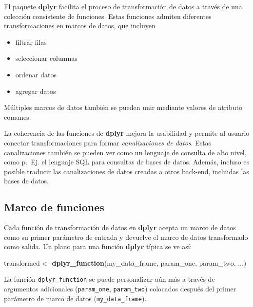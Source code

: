 \documentclass[
]{book}
\newenvironment{Shaded}{\begin{snugshade}}{\end{snugshade}}
\newcommand{\KeywordTok}[1]{\textcolor[rgb]{0.13,0.29,0.53}{\textbf{#1}}}
\newcommand{\NormalTok}[1]{#1}
\newcommand{\StringTok}[1]{\textcolor[rgb]{0.31,0.60,0.02}{#1}}
\providecommand{\tightlist}{%
  \setlength{\itemsep}{0pt}\setlength{\parskip}{0pt}}
\begin{document}
El paquete \textbf{dplyr} facilita el proceso de transformación de datos a través de una colección consistente de funciones. Estas funciones admiten diferentes transformaciones en marcos de datos, que incluyen

\begin{itemize}
\tightlist
\item
  filtrar filas
\item
  seleccionar columnas
\item
  ordenar datos
\item
  agregar datos
\end{itemize}

Múltiples marcos de datos también se pueden unir mediante valores de atributo comunes.

La coherencia de las funciones de \textbf{dplyr} mejora la usabilidad y permite al usuario conectar transformaciones para formar \emph{canalizaciones de datos}. Estas canalizaciones también se pueden ver como un lenguaje de consulta de alto nivel, como p.~Ej. el lenguaje SQL para consultas de bases de datos. Además, incluso es posible traducir las canalizaciones de datos creadas a otros back-end, incluidas las bases de datos.

\hypertarget{marco-de-funciones}{%
\subsection{Marco de funciones}\label{marco-de-funciones}}

Cada función de transformación de datos en \textbf{dplyr} acepta un marco de datos como su primer parámetro de entrada y devuelve el marco de datos transformado como salida. Un plano para una función \textbf{dplyr} típica se ve así:

\begin{Shaded}
\begin{Highlighting}[]
\NormalTok{transformed <-}\StringTok{ }\KeywordTok{dplyr_function}\NormalTok{(my_data_frame, }
\NormalTok{                              param_one, }
\NormalTok{                              param_two, }
\NormalTok{                              ...)}
\end{Highlighting}
\end{Shaded}

La función \texttt{dplyr\_function} se puede personalizar aún más a través de argumentos adicionales (\texttt{param\_one}, \texttt{param\_two}) colocados después del primer parámetro de marco de datos (\texttt{my\_data\_frame}).
\end{document}

